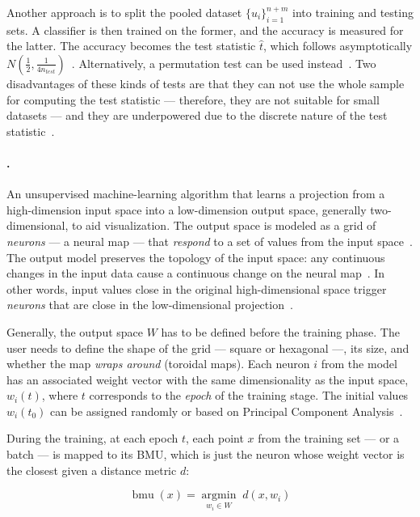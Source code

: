 Another approach is to split the pooled dataset $\{u_i\}_{i=1}^{n+m}$ into training
and testing sets. A classifier is then trained on the former, and the accuracy is
measured for the latter. The accuracy becomes the test statistic $\hat t$, which
follows asymptotically $N(\frac{1}{2}, \frac{1}{4 n_{test}})$~\cite{lopez2016revisiting}.
Alternatively, a permutation test can be used  instead~\cite{kim2021classification}.
Two disadvantages of these kinds of tests are that they can not use the whole sample
for computing the test statistic --- therefore, they are not suitable for small
datasets --- and they are underpowered due to the discrete nature of the test
statistic~\cite{rosenblatt2021better}.

\paragraph{.}
An unsupervised machine-learning algorithm that learns
a projection from a high-dimension input space into a low-dimension output space,
generally two-dimensional, to aid visualization.
The output space is modeled as a grid of \emph{neurons} --- a neural map ---
that \emph{respond} to a set of values from the input space~\cite{kohonen1982self}.
The output model preserves the topology of the input space: any continuous changes
in the input data cause a continuous change on the neural map~\cite{Villmann1999}.
In other words, input values close in the original high-dimensional space
trigger \emph{neurons} that are close in the low-dimensional projection~\cite{KOHONEN201352}.

Generally, the output space $W$ has to be defined before the training phase.
The user needs to define the shape of the grid --- square or hexagonal ---,
its size, and whether the map \emph{wraps around} (toroidal maps).
Each neuron $i$ from the model has an associated weight vector with the same
dimensionality as the input space, $w_{i}(t)$, where $t$ corresponds to the
\emph{epoch} of the training stage.
The initial values $w_i(t_0)$ can be assigned randomly or based on
Principal Component Analysis~\cite{KOHONEN201352}.

During the training, at each epoch $t$, each point $x$ from the training set
--- or a batch --- is mapped to its \gls{BMU}, which is
just the neuron whose weight vector is the closest given a distance metric $d$:

\begin{equation}
    \operatorname{bmu}(x) = \underset{w_i \in W}{\operatorname{argmin}} \; d(x, w_i)
\end{equation}

